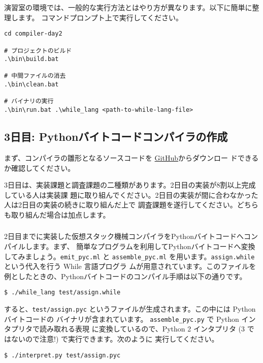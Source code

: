 \documentclass[a4paper,11pt]{jsarticle}
\begin{document}
演習室の環境では、一般的な実行方法とはやり方が異なります。以下に簡単に整理します。
コマンドプロンプト上で実行してください。

\begin{lstlisting}
cd compiler-day2

# プロジェクトのビルド
.\bin\build.bat

# 中間ファイルの消去
.\bin\clean.bat

# バイナリの実行
.\bin\run.bat .\while_lang <path-to-while-lang-file>
\end{lstlisting}

\subsection{3日目: Pythonバイトコードコンパイラの作成}

まず、コンパイラの雛形となるソースコードを
\href{https://github.com/tmu-compiler-info-sys-exp-I/compiler-day3}{GitHub}からダウンロー
ドできるか確認してください。

3日目は、実装課題と調査課題の二種類があります。2日目の実装が8割以上完成している人は実装課
題に取り組んでください。2日目の実装が間に合わなかった人は2日目の実装の続きに取り組んだ上で
調査課題を遂行してください。どちらも取り組んだ場合は加点します。

\subsubsection{}

2日目までに実装した仮想スタック機械コンパイラをPythonバイトコードへコンパイルします。まず、
簡単なプログラムを利用してPythonバイトコードへ変換してみましょう。\verb|emit_pyc.ml| と
\verb|assemble_pyc.ml| を用います。\verb|assign.while| という代入を行う While 言語プログラ
ムが用意されています。このファイルを例としたときの、Pythonバイトコードのコンパイル手順は以下の通りです。

\begin{lstlisting}
$ ./while_lang test/assign.while
\end{lstlisting}

すると、\verb|test/assign.pyc| というファイルが生成されます。この中には Pythonバイトコードの
バイナリが含まれています。 \verb|assemble_pyc.py| で Python インタプリタで読み取れる表現
に変換しているので、Python 2 インタプリタ (3 ではないので注意!) で実行できます。次のように
実行してください。

\begin{lstlisting}
$ ./interpret.py test/assign.pyc
\end{lstlisting}
\end{document}

